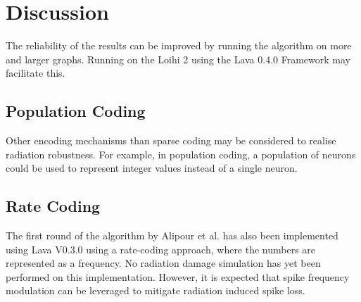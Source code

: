 
\section{Discussion}\label{sec:discussion}
The reliability of the results can be improved by running the algorithm on more and larger graphs. Running on the Loihi 2 using the Lava 0.4.0 Framework may facilitate this.
\subsection*{Population Coding}\label{subsec:population_coding}
Other encoding mechanisms than sparse coding may be considered to realise radiation robustness. For example, in population coding, a population of neurons could be used to represent integer values instead of a single neuron. %

\subsection*{Rate Coding}\label{subsec:rate_coding}
The first round of the algorithm by Alipour et al. has also been implemented using Lava V0.3.0 using a rate-coding approach, where the numbers are represented as a frequency. No radiation damage simulation has yet been performed on this implementation. However, it is expected that spike frequency modulation can be leveraged to mitigate radiation induced spike loss.


